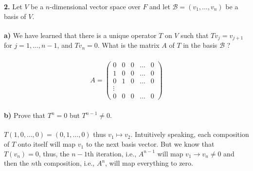 \documentclass[11pt]{amsart}
\theoremstyle{definition}  %
\begin{document}
\pagebreak
\vskip 0.1cm
\noindent
{\bf 2.}  Let $V$ be a $n$-dimensional vector space over $F$ and let $\mathcal{B} = (v_1, \ldots, v_n)$ be a basis of $V$. \\ \\
{\bf a)} We have learned that there is a unique operator $T$ on $V$ such that $Tv_j = v_{j+1}$ for $j=1, \ldots, n-1$, and $Tv_n = 0$. 
What is the matrix $A$ of $T$ in the basis $\mathcal{B}$ ? \\
\\
\begin{align*}
	A=\left( \begin{array}{ccccc}
		0&0&0&\dots&0 \\
		1&0&0&\dots& 0 \\
		0&1&0&\dots&0\\
		\vdots \\
		0&0&0&\dots& 0
	\end{array} \right)
\end{align*}
\\
{\bf b)} Prove that $T^n = 0$ but $T^{n-1} \neq 0$. \\
\\
$T(1,0,\dots,0) = (0,1,\dots,0)$  thus $v_1 \mapsto v_2$.  Intuitively speaking, each composition of $T$ onto itself will map $v_1$ to the next basis vector.  But we know that $T(v_n) = 0$, thus, the $n-1$th iteration, i.e., $A^{n-1}$ will map $v_1 \to v_{n} \ne 0$ and then the $n$th composition, i.e., $A^n$, will map everything to zero.
\end{document}
